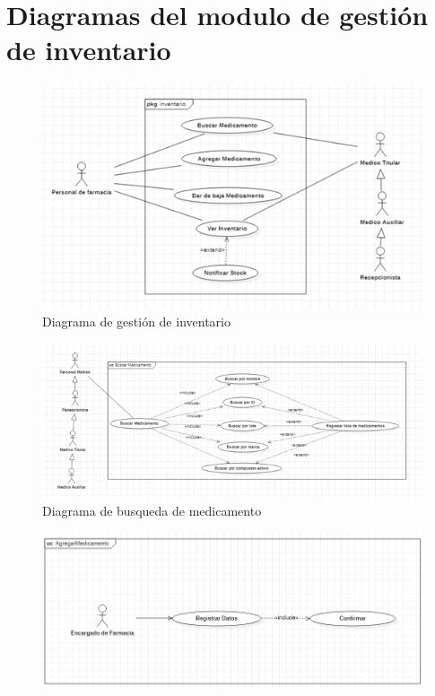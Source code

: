 \documentclass[12pt,letterpaper]{article}
\begin{document}
{    \section{Diagramas del modulo de gestión de inventario}
        \begin{figure}[!htb]
            \centering
            \includegraphics [scale=0.8]{gestionInventario}
            \caption{Diagrama de gestión de inventario}
        \end{figure}
        \begin{figure}[!htb]
            \centering
            \includegraphics [scale=0.9]{buscarMedicamentos}
            \caption{Diagrama de busqueda de medicamento}
        \end{figure}
        \begin{figure}[!htb]
            \centering
            \includegraphics [scale=0.5]{agregarMedicamento}

\end{figure}}
\end{document}
